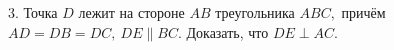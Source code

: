 3. Точка $D$ лежит на стороне $AB$ треугольника $ABC,$ причём $AD=DB=DC,\ DE\parallel BC.$ Доказать, что $DE\perp AC.$\\
